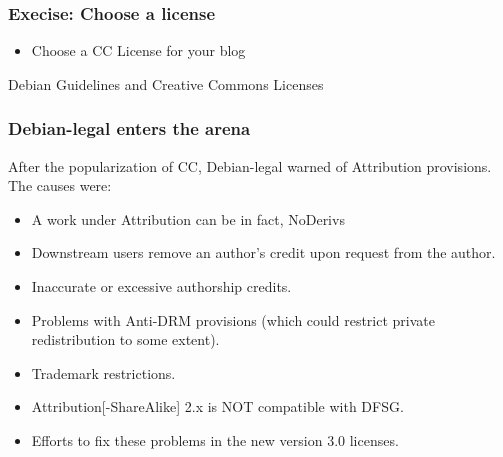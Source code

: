 
\begin{frame}
\frametitle{Execise: Choose a license}

\begin{itemize}
\item Choose a CC License for your blog
\end{itemize}
\end{frame}




\begin{frame}
\begin{center}
\huge{Debian Guidelines and Creative Commons Licenses}
\end{center}

\end{frame}



\begin{frame}
\frametitle{Debian-legal enters the arena}

After the popularization of CC, Debian-legal warned of
Attribution provisions. The causes were:

\begin{itemize}
\item A work under Attribution can be in fact, NoDerivs 
\item Downstream users remove an author's credit upon request from the author.
\item Inaccurate or excessive authorship credits.
\item Problems with Anti-DRM provisions (which could restrict private redistribution to some extent).
\item Trademark restrictions.
\item Attribution[-ShareAlike] 2.x is NOT compatible with DFSG. 
\item Efforts to fix these problems in the new version 3.0 licenses.

\end{itemize}


\end{frame}




